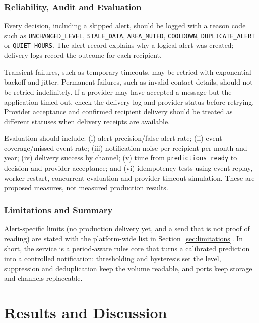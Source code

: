 \documentclass[10pt,openany]{report}
\begin{document}
\subsection{Reliability, Audit and Evaluation}
Every decision, including a skipped alert, should be logged with a reason code such as \texttt{UNCHANGED\_LEVEL}, \texttt{STALE\_DATA}, \texttt{AREA\_MUTED}, \texttt{COOLDOWN}, \texttt{DUPLICATE\_ALERT} or \texttt{QUIET\_HOURS}. The alert record explains why a logical alert was created; delivery logs record the outcome for each recipient.

Transient failures, such as temporary timeouts, may be retried with exponential backoff and jitter. Permanent failures, such as invalid contact details, should not be retried indefinitely. If a provider may have accepted a message but the application timed out, check the delivery log and provider status before retrying. Provider acceptance and confirmed recipient delivery should be treated as different statuses when delivery receipts are available.

Evaluation should include: (i) alert precision/false-alert rate; (ii) event coverage/missed-event rate; (iii) notification noise per recipient per month and year; (iv) delivery success by channel; (v) time from \texttt{predictions\_ready} to decision and provider acceptance; and (vi) idempotency tests using event replay, worker restart, concurrent evaluation and provider-timeout simulation. These are proposed measures, not measured production results.

\subsection{Limitations and Summary}
Alert-specific limits (no production delivery yet, and a send that is not proof of reading) are stated with the platform-wide list in Section~\ref{sec:limitations}. In short, the service is a period-aware rules core that turns a calibrated prediction into a controlled notification: thresholding and hysteresis set the level, suppression and deduplication keep the volume readable, and ports keep storage and channels replaceable.
\chapter{Results and Discussion}
\label{ch:results}
\end{document}
